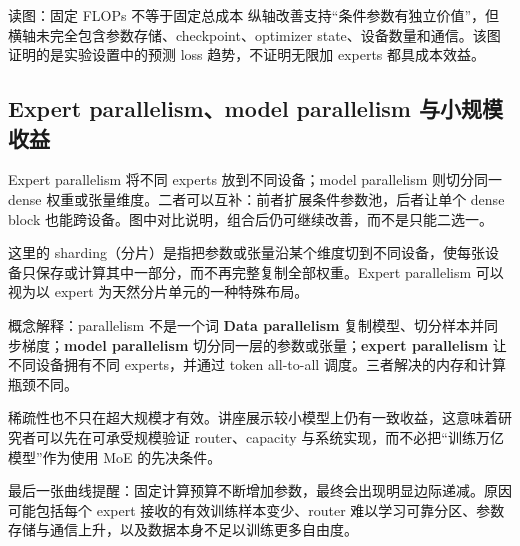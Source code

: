 \begin{knowledgebox}{读图：固定 FLOPs 不等于固定总成本}
纵轴改善支持“条件参数有独立价值”，但横轴未完全包含参数存储、checkpoint、optimizer state、设备数量和通信。该图证明的是实验设置中的预测 loss 趋势，不证明无限加 experts 都具成本效益。
\end{knowledgebox}

\subsection{Expert parallelism、model parallelism 与小规模收益}

Expert parallelism 将不同 experts 放到不同设备；model parallelism 则切分同一 dense 权重或张量维度。二者可以互补：前者扩展条件参数池，后者让单个 dense block 也能跨设备。图中对比说明，组合后仍可继续改善，而不是只能二选一。

这里的 sharding（分片）是指把参数或张量沿某个维度切到不同设备，使每张设备只保存或计算其中一部分，而不再完整复制全部权重。Expert parallelism 可以视为以 expert 为天然分片单元的一种特殊布局。


\begin{knowledgebox}{概念解释：parallelism 不是一个词}
\textbf{Data parallelism} 复制模型、切分样本并同步梯度；\textbf{model parallelism} 切分同一层的参数或张量；\textbf{expert parallelism} 让不同设备拥有不同 experts，并通过 token all-to-all 调度。三者解决的内存和计算瓶颈不同。
\end{knowledgebox}

稀疏性也不只在超大规模才有效。讲座展示较小模型上仍有一致收益，这意味着研究者可以先在可承受规模验证 router、capacity 与系统实现，而不必把“训练万亿模型”作为使用 MoE 的先决条件。



最后一张曲线提醒：固定计算预算不断增加参数，最终会出现明显边际递减。原因可能包括每个 expert 接收的有效训练样本变少、router 难以学习可靠分区、参数存储与通信上升，以及数据本身不足以训练更多自由度。


